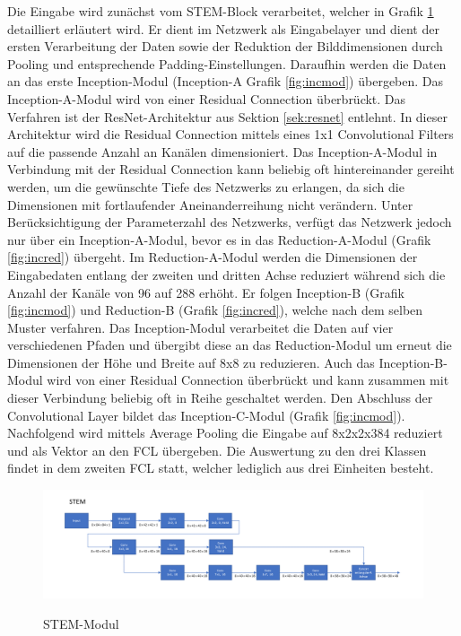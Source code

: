 Die Eingabe wird zunächst vom STEM-Block verarbeitet, welcher in Grafik \ref{fig:stem} detailliert erläutert wird. Er dient im Netzwerk als Eingabelayer und dient der ersten Verarbeitung der Daten sowie der Reduktion der Bilddimensionen durch Pooling und entsprechende Padding-Einstellungen. Daraufhin werden die Daten an das erste Inception-Modul (Inception-A Grafik \ref{fig:incmod}) übergeben. Das Inception-A-Modul wird von einer Residual Connection überbrückt. Das Verfahren ist der ResNet-Architektur aus Sektion \ref{sek:resnet} entlehnt. In dieser Architektur wird die Residual Connection mittels eines 1x1 Convolutional Filters auf die passende Anzahl an Kanälen dimensioniert. Das Inception-A-Modul in Verbindung mit der Residual Connection kann beliebig oft hintereinander gereiht werden, um die gewünschte Tiefe des Netzwerks zu erlangen, da sich die Dimensionen mit fortlaufender Aneinanderreihung nicht verändern. Unter Berücksichtigung der Parameterzahl des Netzwerks, verfügt das Netzwerk jedoch nur über ein Inception-A-Modul, bevor es in das Reduction-A-Modul (Grafik \ref{fig:incred}) übergeht. Im Reduction-A-Modul werden die Dimensionen der Eingabedaten entlang der zweiten und dritten Achse reduziert während sich die Anzahl der Kanäle von 96 auf 288 erhöht. Er folgen Inception-B (Grafik \ref{fig:incmod}) und Reduction-B (Grafik \ref{fig:incred}), welche nach dem selben Muster verfahren. Das Inception-Modul verarbeitet die Daten auf vier verschiedenen Pfaden und übergibt diese an das Reduction-Modul um erneut die Dimensionen der Höhe und Breite auf 8x8 zu reduzieren. Auch das Inception-B-Modul wird von einer Residual Connection überbrückt und kann zusammen mit dieser Verbindung beliebig oft in Reihe geschaltet werden. Den Abschluss der Convolutional Layer bildet das Inception-C-Modul (Grafik \ref{fig:incmod}). Nachfolgend wird mittels Average Pooling die Eingabe auf 8x2x2x384 reduziert und als Vektor an den FCL übergeben. Die Auswertung zu den drei Klassen findet in dem zweiten FCL statt, welcher lediglich aus drei Einheiten besteht. 

\begin{figure}
\centering
\caption[Caption for LOF]{STEM-Modul}
\includegraphics[scale=0.75]{pictures/Inception/STEM}
\label{fig:stem}
\end{figure}

